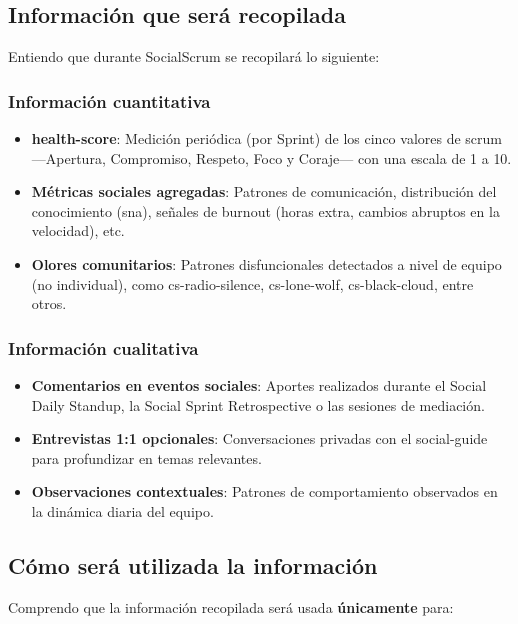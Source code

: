 \subsection{Información que será recopilada}

Entiendo que durante SocialScrum se recopilará lo siguiente:

\subsubsection{Información cuantitativa}
\begin{itemize}
    \item \textbf{\gls{health-score}}: Medición periódica (por Sprint) de los cinco valores de \gls{scrum} —Apertura, Compromiso, Respeto, Foco y Coraje— con una escala de 1 a 10.
    \item \textbf{Métricas sociales agregadas}: Patrones de comunicación, distribución del conocimiento (\gls{sna}), señales de \gls{burnout} (horas extra, cambios abruptos en la velocidad), etc.
    \item \textbf{Olores comunitarios}: Patrones disfuncionales detectados a nivel de equipo (no individual), como \gls{cs-radio-silence}, \gls{cs-lone-wolf}, \gls{cs-black-cloud}, entre otros.
\end{itemize}

\subsubsection{Información cualitativa}

\begin{itemize}
    \item \textbf{Comentarios en eventos sociales}: Aportes realizados durante el Social Daily Standup, la Social Sprint Retrospective o las sesiones de mediación.
    \item \textbf{Entrevistas 1:1 opcionales}: Conversaciones privadas con el \gls{social-guide} para profundizar en temas relevantes.
    \item \textbf{Observaciones contextuales}: Patrones de comportamiento observados en la dinámica diaria del equipo.
\end{itemize}

\subsection{Cómo será utilizada la información}

Comprendo que la información recopilada será usada \textbf{únicamente} para:

